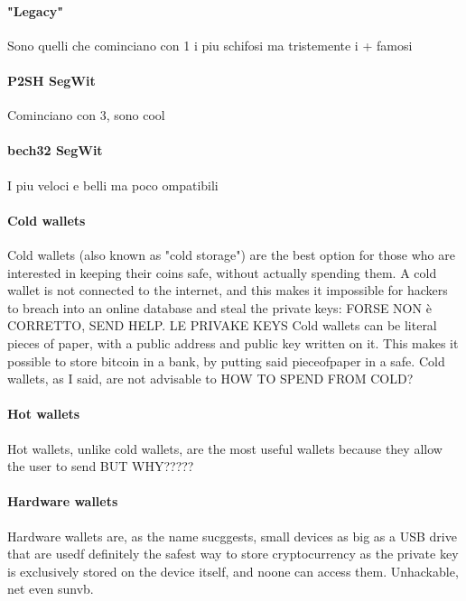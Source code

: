 \documentclass {article}
\begin{document}
\paragraph {"Legacy"}


Sono quelli che cominciano con 1 i piu schifosi ma tristemente i + famosi


\paragraph {P2SH SegWit}


Cominciano con 3, sono cool


\paragraph {bech32 SegWit}


I piu veloci e belli ma poco ompatibili


\paragraph {Cold wallets}


Cold wallets (also known as "cold storage") are the best option for those who are interested in keeping their coins safe, without actually spending them.
A cold wallet is not connected to the internet, and this makes it impossible for hackers to breach into an online database and steal the private keys: FORSE NON è CORRETTO, SEND HELP. LE PRIVAKE KEYS 
Cold wallets can be literal pieces of paper, with a public address and public key written on it. This makes it possible to store bitcoin in a bank, by putting said pieceofpaper in a safe.
Cold wallets, as I said, are not advisable to HOW TO SPEND FROM COLD?


\paragraph {Hot wallets}


Hot wallets, unlike cold wallets, are the most useful wallets because they allow the user to send BUT WHY?????


\paragraph {Hardware wallets}


Hardware wallets are, as the name sucggests, small devices as big as a USB drive that are usedf
definitely the safest way to store cryptocurrency as the private key is exclusively stored on the device itself, and noone can access them. Unhackable, net even sunvb.
\end{document}
